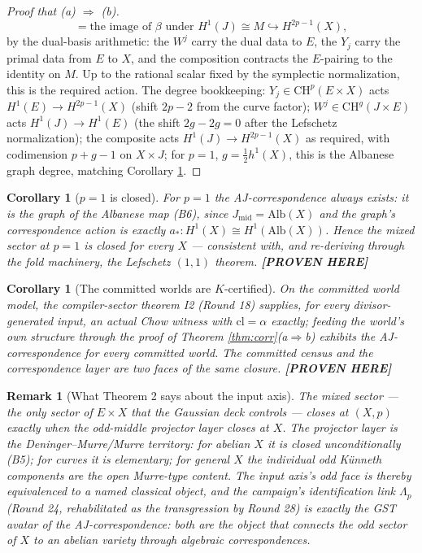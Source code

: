 \documentclass[11pt]{article}
\newtheorem{corollary}[theorem]{Corollary}
\newtheorem{remark}[theorem]{Remark}
\newcommand{\PROVEN}{\textbf{[PROVEN HERE]}}
\newcommand{\CH}{\mathrm{CH}}
\begin{document}
\begin{proof}[Proof that (a) $\Rightarrow$ (b)]
\[=\text{the image of }\beta\text{ under }H^1(J)\cong M\hookrightarrow H^{2p-1}(X),
\]
by the dual-basis arithmetic: the $W^j$ carry the dual data to $E$, the $Y_j$
carry the primal data from $E$ to $X$, and the composition contracts the
$E$-pairing to the identity on $M$. Up to the rational scalar fixed by the
symplectic normalization, this is the required action. The degree
bookkeeping: $Y_j\in\CH^p(E\times X)$ acts $H^1(E)\to H^{2p-1}(X)$ (shift
$2p-2$ from the curve factor); $W^j\in\CH^{g}(J\times E)$ acts
$H^1(J)\to H^1(E)$ (the shift $2g-2g=0$ after the Lefschetz normalization);
the composite acts $H^1(J)\to H^{2p-1}(X)$ as required, with codimension
$p+g-1$ on $X\times J$; for $p=1$, $g=\tfrac12 h^1(X)$, this is the Albanese
graph degree, matching Corollary \ref{cor:p1}.
\end{proof}

\begin{corollary}[$p=1$ is closed]\label{cor:p1}
For $p=1$ the AJ-correspondence always exists: it is the graph of the
Albanese map (B6), since $J_{\mathrm{mid}}=\mathrm{Alb}(X)$ and the graph's
correspondence action is exactly $a_*\colon H^1(X)\cong H^1(\mathrm{Alb}(X))$.
Hence the mixed sector at $p=1$ is closed for every $X$ --- consistent with,
and re-deriving through the fold machinery, the Lefschetz $(1,1)$ theorem.
\PROVEN{}
\end{corollary}

\begin{corollary}[The committed worlds are $K$-certified]\label{cor:worlds}
On the committed world model, the compiler-sector theorem I2 (Round 18)
supplies, for every divisor-generated input, an actual Chow witness with
$\mathrm{cl}=\alpha$ exactly; feeding the world's own structure through the
proof of Theorem \ref{thm:corr}(a$\Rightarrow$b) exhibits the
AJ-correspondence for every committed world. The committed census and the
correspondence layer are two faces of the same closure.
\PROVEN{}
\end{corollary}

\begin{remark}[What Theorem 2 says about the input axis]
The mixed sector --- the only sector of $E\times X$ that the Gaussian deck
controls --- closes at $(X,p)$ exactly when the odd-middle projector layer
closes at $X$. The projector layer is the Deninger--Murre/Murre territory:
for abelian $X$ it is closed unconditionally (B5); for curves it is
elementary; for general $X$ the individual odd K\"unneth components are the
open Murre-type content. The input axis's \emph{odd face} is thereby
equivalenced to a named classical object, and the campaign's identification
link $\Lambda_p$ (Round 24, rehabilitated as the transgression by Round 28)
is exactly the GST avatar of the AJ-correspondence: both are the object that
connects the odd sector of $X$ to an abelian variety through algebraic
correspondences.
\end{remark}
\end{document}
